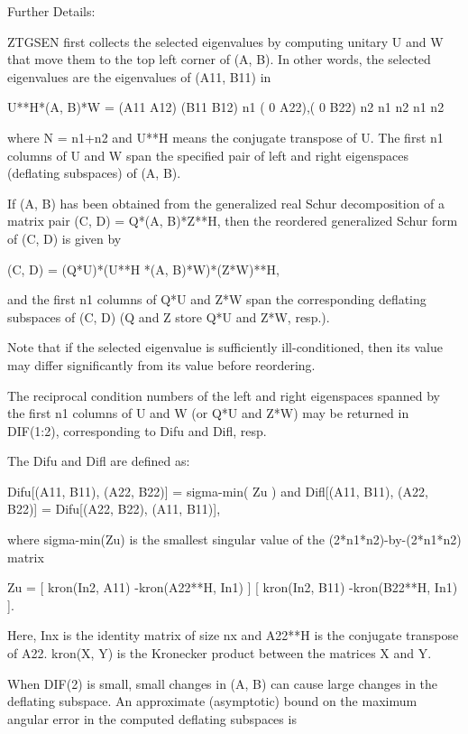 \begin{DoxyParagraph}{Further Details\+: }
\begin{DoxyVerb}  ZTGSEN first collects the selected eigenvalues by computing unitary
  U and W that move them to the top left corner of (A, B). In other
  words, the selected eigenvalues are the eigenvalues of (A11, B11) in

              U**H*(A, B)*W = (A11 A12) (B11 B12) n1
                              ( 0  A22),( 0  B22) n2
                                n1  n2    n1  n2

  where N = n1+n2 and U**H means the conjugate transpose of U. The first
  n1 columns of U and W span the specified pair of left and right
  eigenspaces (deflating subspaces) of (A, B).

  If (A, B) has been obtained from the generalized real Schur
  decomposition of a matrix pair (C, D) = Q*(A, B)*Z**H, then the
  reordered generalized Schur form of (C, D) is given by

           (C, D) = (Q*U)*(U**H *(A, B)*W)*(Z*W)**H,

  and the first n1 columns of Q*U and Z*W span the corresponding
  deflating subspaces of (C, D) (Q and Z store Q*U and Z*W, resp.).

  Note that if the selected eigenvalue is sufficiently ill-conditioned,
  then its value may differ significantly from its value before
  reordering.

  The reciprocal condition numbers of the left and right eigenspaces
  spanned by the first n1 columns of U and W (or Q*U and Z*W) may
  be returned in DIF(1:2), corresponding to Difu and Difl, resp.

  The Difu and Difl are defined as:

       Difu[(A11, B11), (A22, B22)] = sigma-min( Zu )
  and
       Difl[(A11, B11), (A22, B22)] = Difu[(A22, B22), (A11, B11)],

  where sigma-min(Zu) is the smallest singular value of the
  (2*n1*n2)-by-(2*n1*n2) matrix

       Zu = [ kron(In2, A11)  -kron(A22**H, In1) ]
            [ kron(In2, B11)  -kron(B22**H, In1) ].

  Here, Inx is the identity matrix of size nx and A22**H is the
  conjugate transpose of A22. kron(X, Y) is the Kronecker product between
  the matrices X and Y.

  When DIF(2) is small, small changes in (A, B) can cause large changes
  in the deflating subspace. An approximate (asymptotic) bound on the
  maximum angular error in the computed deflating subspaces is


\end{DoxyVerb}
\end{DoxyParagraph}
